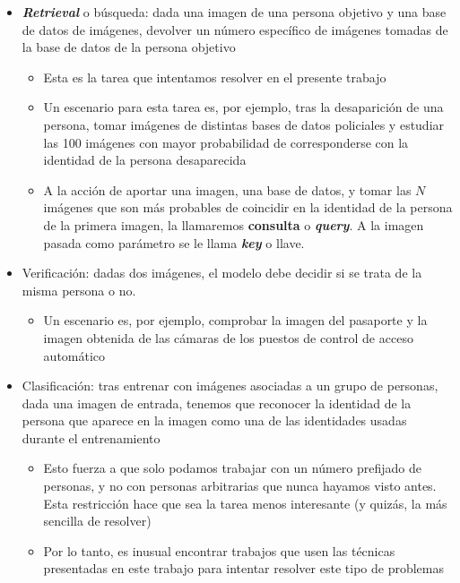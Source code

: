 \begin{itemize}
    \item \textbf{\textit{Retrieval}} o búsqueda: dada una imagen de una persona objetivo y una base de datos de imágenes, devolver un número específico de imágenes tomadas de la base de datos de la persona objetivo

        \begin{itemize}
            \item Esta es la tarea que intentamos resolver en el presente trabajo
            \item Un escenario para esta tarea es, por ejemplo, tras la desaparición de una persona, tomar imágenes de distintas bases de datos policiales y estudiar las 100 imágenes con mayor probabilidad de corresponderse con la identidad de la persona desaparecida
            \item A la acción de aportar una imagen, una base de datos, y tomar las $N$ imágenes que son más probables de coincidir en la identidad de la persona de la primera imagen, la llamaremos \textbf{consulta} o \textbf{\textit{query}}. A la imagen pasada como parámetro se le llama \textbf{\textit{key}} o llave.
        \end{itemize}

    \item Verificación: dadas dos imágenes, el modelo debe decidir si se trata de la misma persona o no.
        \begin{itemize}
            \item Un escenario es, por ejemplo, comprobar la imagen del pasaporte y la imagen obtenida de las cámaras de los puestos de control de acceso automático \cite{informatica:docface}
        \end{itemize}

    \item Clasificación: tras entrenar con imágenes asociadas a un grupo de personas, dada una imagen de entrada, tenemos que reconocer la identidad de la persona que aparece en la imagen como una de las identidades usadas durante el entrenamiento
        \begin{itemize}
            \item Esto fuerza a que solo podamos trabajar con un número prefijado de personas, y no con personas arbitrarias que nunca hayamos visto antes. Esta restricción hace que sea la tarea menos interesante (y quizás, la más sencilla de resolver)
            \item Por lo tanto, es inusual encontrar trabajos que usen las técnicas presentadas en este trabajo para intentar resolver este tipo de problemas
        \end{itemize}

\end{itemize}


